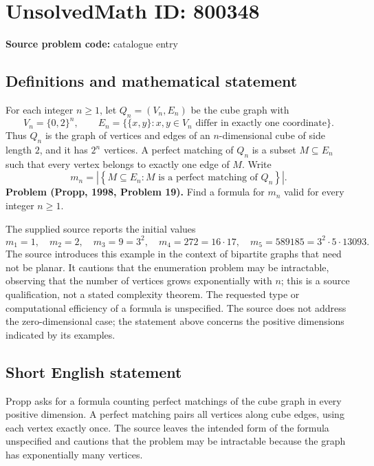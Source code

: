 \documentclass[11pt]{article}
\begin{document}
\section*{UnsolvedMath ID: 800348}
\textbf{Source problem code:} catalogue entry
\subsection{Definitions and mathematical statement}
For each integer \(n\geq 1\), let \(Q_n=(V_n,E_n)\) be the cube graph with
\[
V_n=\{0,2\}^{n},\qquad
E_n=\bigl\{\{x,y\}:x,y\in V_n\text{ differ in exactly one coordinate}\bigr\}.
\]
Thus \(Q_n\) is the graph of vertices and edges of an \(n\)-dimensional cube of side length \(2\), and it has \(2^n\) vertices. A perfect matching of \(Q_n\) is a subset \(M\subseteq E_n\) such that every vertex belongs to exactly one edge of \(M\). Write
\[
m_n=\left|\left\{M\subseteq E_n:M\text{ is a perfect matching of }Q_n\right\}\right|.
\]
\textbf{Problem (Propp, 1998, Problem 19).} Find a formula for \(m_n\) valid for every integer \(n\geq 1\).

The supplied source reports the initial values
\[
m_1=1,\quad m_2=2,\quad m_3=9=3^2,\quad
m_4=272=16\cdot17,\quad
m_5=589185=3^2\cdot5\cdot13093.
\]
The source introduces this example in the context of bipartite graphs that need not be planar. It cautions that the enumeration problem may be intractable, observing that the number of vertices grows exponentially with \(n\); this is a source qualification, not a stated complexity theorem. The requested type or computational efficiency of a formula is unspecified. The source does not address the zero-dimensional case; the statement above concerns the positive dimensions indicated by its examples.
\subsection{Short English statement}
Propp asks for a formula counting perfect matchings of the cube graph in every positive dimension. A perfect matching pairs all vertices along cube edges, using each vertex exactly once. The source leaves the intended form of the formula unspecified and cautions that the problem may be intractable because the graph has exponentially many vertices.
\end{document}
